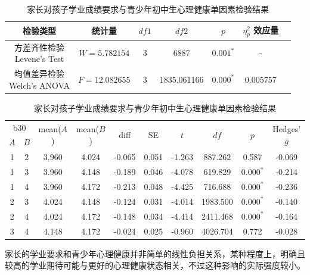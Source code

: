 \documentclass[zihao = -4, linespread = 1.5]{article}
\begin{document}
\begin{table}[htbp]
    \centering
    \setlength{\tabcolsep}{8pt}
    \renewcommand{\arraystretch}{1.2}
    \caption{家长对孩子学业成绩要求与青少年初中生心理健康单因素检验结果}\label{table-anova-requirement-health}
    \begin{tabular}{ccccccc}
        \bottomrule[1.5pt]
        检验类型 & 统计量 & $df1$ & $df2$ & $p$ & $\eta^2_p$ 效应量 \\
        \midrule[0.75pt]
        \makecell{方差齐性检验 \\ Levene's Test} & $W=5.782154$ & 3 & 6887 & $\bm{0.001^{*}}$ & - \\
        \midrule[0.75pt]
        \makecell{均值差异检验 \\ Welch's ANOVA} & $F=12.082655$ & 3 & 1835.061166 & $\bm{0.000^{*}}$ & 0.005757 \\
    \end{tabular}
    \setlength{\tabcolsep}{6pt}
    \renewcommand{\arraystretch}{1.2}
    \begin{tabular}{cccccccccc}
        \bottomrule[1.5pt]
        \multicolumn{2}{c}{b30} & \multirow{2}{*}{mean($A$)} & \multirow{2}{*}{mean($B$)} & \multirow{2}{*}{diff} & \multirow{2}{*}{SE} & \multirow{2}{*}{$t$} & \multirow{2}{*}{$df$} & \multirow{2}{*}{$p$} & \multirow{2}{*}{Hedges' $g$} \\
        \cmidrule[0.75pt](lr){1-2}
        $A$ & $B$ \\
        \midrule[0.75pt]
        1 & 2 & 3.960 & 4.024 & -0.065 & 0.051 & -1.263 & 887.262 & 0.587 & -0.069 \\
        1 & 3 & 3.960 & 4.148 & -0.189 & 0.046 & -4.078 & 619.829 & $\bm{0.000^{*}}$ & -0.214 \\
        1 & 4 & 3.960 & 4.172 & -0.213 & 0.048 & -4.425 & 716.688 & $\bm{0.000^{*}}$ & -0.236 \\
        2 & 3 & 4.024 & 4.148 & -0.124 & 0.031 & -4.014 & 1983.500 & $\bm{0.000^{*}}$ & -0.140 \\
        2 & 4 & 4.024 & 4.172 & -0.148 & 0.034 & -4.414 & 2411.468 & $\bm{0.000^{*}}$ & -0.164 \\
        3 & 4 & 4.148 & 4.172 & -0.024 & 0.025 & -0.960 & 4026.704 & 0.772 & -0.028 \\
        \toprule[1.5pt]
    \end{tabular}
\end{table}

家长的学业要求和青少年心理健康并非简单的线性负担关系，某种程度上，明确且较高的学业期待可能与更好的心理健康状态相关，不过这种影响的实际强度较小。
\end{document}
